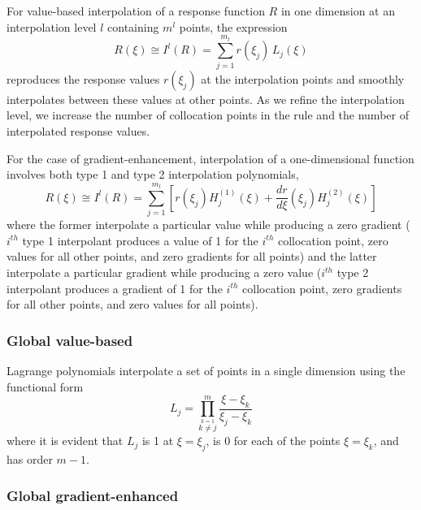 For value-based interpolation of a response function $R$ in one
dimension at an interpolation level $l$ containing $m^l$ points, the
expression
\begin{equation}
R(\xi) \cong I^l(R) = \sum_{j=1}^{m_l} r(\xi_j)\,L_j(\xi) \label{eq:lagrange_interp_1d}
\end{equation}
reproduces the response values $r(\xi_j)$ at the interpolation points
and smoothly interpolates between these values at other points.  As we
refine the interpolation level, we increase the number of collocation 
points in the rule and the number of interpolated response values.

For the case of gradient-enhancement, interpolation of a 
one-dimensional function
involves both type 1 and type 2 interpolation polynomials,
\begin{equation}
R(\xi) \cong I^l(R) = \sum_{j=1}^{m_l} \left[ r(\xi_j) H_j^{(1)}(\xi) + 
  \frac{dr}{d\xi}(\xi_j) H_j^{(2)}(\xi) \right] \label{eq:hermite_interp_1d}
\end{equation}
where the former interpolate a particular value while producing a zero
gradient ($i^{th}$ type 1 interpolant produces a value of 1 for the
$i^{th}$ collocation point, zero values for all other points, and zero
gradients for all points) and the latter interpolate a particular
gradient while producing a zero value ($i^{th}$ type 2 interpolant
produces a gradient of 1 for the $i^{th}$ collocation point, zero
gradients for all other points, and zero values for all points).


\subsubsection{Global value-based} \label{uq:expansion:interp:Lagrange}

Lagrange polynomials interpolate a set of points in a single dimension
using the functional form
\begin{equation}
L_j = \prod_{\stackrel{\scriptstyle k=1}{k \ne j}}^m 
\frac{\xi - \xi_k}{\xi_j - \xi_k} \label{eq:lagrange_poly_1d}
\end{equation}
where it is evident that $L_j$ is 1 at $\xi = \xi_j$, is 0 for each of
the points $\xi = \xi_k$, and has order $m - 1$.

\subsubsection{Global gradient-enhanced} \label{uq:expansion:interp:Hermite}

